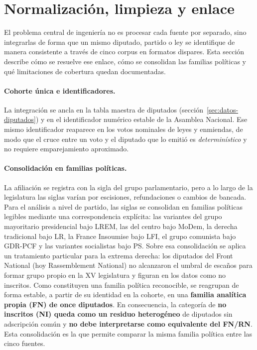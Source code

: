 \section{Normalización, limpieza y enlace}
\label{sec:normalizacion}

El problema central de ingeniería no es procesar cada fuente por separado, sino
integrarlas de forma que un mismo diputado, partido o ley se identifique de
manera consistente a través de cinco corpus en formatos dispares. Esta sección
describe cómo se resuelve ese enlace, cómo se consolidan las familias políticas y
qué limitaciones de cobertura quedan documentadas.

\paragraph{Cohorte única e identificadores.}
La integración se ancla en la tabla maestra de diputados
(sección~\ref{sec:datos-diputados}) y en el identificador numérico estable de la
Asamblea Nacional. Ese mismo identificador reaparece en los votos nominales de
leyes y enmiendas, de modo que el cruce entre un voto y el diputado que lo emitió
es \emph{determinístico} y no requiere emparejamiento aproximado.

\paragraph{Consolidación en familias políticas.}
La afiliación se registra con la sigla del grupo parlamentario, pero a lo largo
de la legislatura las siglas varían por escisiones, refundaciones o cambios de
bancada. Para el análisis a nivel de partido, las siglas se consolidan en
familias políticas legibles mediante una correspondencia explícita: las variantes
del grupo mayoritario presidencial bajo LREM, las del centro bajo MoDem, la
derecha tradicional bajo LR, la France Insoumise bajo LFI, el grupo comunista
bajo GDR-PCF y las variantes socialistas bajo PS. Sobre esa consolidación se
aplica un tratamiento particular para la extrema derecha: los diputados del Front
National (hoy Rassemblement National) no alcanzaron el umbral de escaños para
formar grupo propio en la XV legislatura y figuran en los datos como no inscritos.
Como constituyen una familia política reconocible, se reagrupan de forma estable,
a partir de su identidad en la cohorte, en una \textbf{familia analítica propia
(FN) de once diputados}. En consecuencia, la categoría de \textbf{no inscritos
(NI) queda como un residuo heterogéneo} de diputados sin adscripción común y
\textbf{no debe interpretarse como equivalente del FN/RN}. Esta consolidación es
la que permite comparar la misma familia política entre las cinco fuentes.

